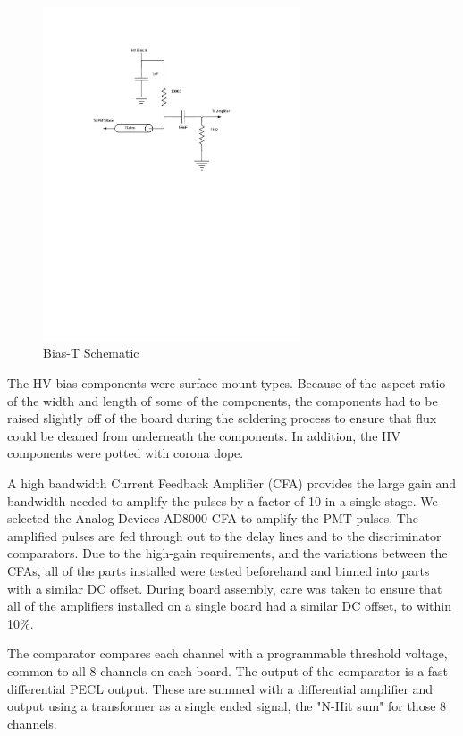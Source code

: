 \documentclass{JINST}
\begin{document}
\begin{figure}[ht]
\begin{center}
\includegraphics[width=3in, keepaspectratio=true, trim=1.5in 5.5in 2in 1.25in, clip=true]{graphics/bias}
\caption{Bias-T Schematic
\label{fig:bias}}
\end{center}
\end{figure}

The HV bias components were surface mount types.  Because of the
aspect ratio of the width and length of some of the components, the
components had to be raised slightly off of the board during the
soldering process to ensure that flux could be cleaned from underneath
the components.  In addition, the HV components were potted with
corona dope.

A high bandwidth Current Feedback Amplifier (CFA) provides the large
gain and bandwidth needed to amplify the pulses by a factor of 10 in a
single stage.  We selected the Analog Devices AD8000 CFA to amplify
the PMT pulses.  The amplified pulses are fed through out to the delay
lines and to the discriminator comparators.  Due to the high-gain
requirements, and the variations between the CFAs, all of the parts
installed were tested beforehand and binned into parts with a similar
DC offset.  During board assembly, care was taken to ensure that all
of the amplifiers installed on a single board had a similar DC offset,
to within 10\%.

The comparator compares each channel with a programmable threshold
voltage, common to all 8 channels on each board.  The output of the
comparator is a fast differential PECL output.  These are summed with
a differential amplifier and output using a transformer as a single
ended signal, the "N-Hit sum" for those 8 channels.
\end{document}
